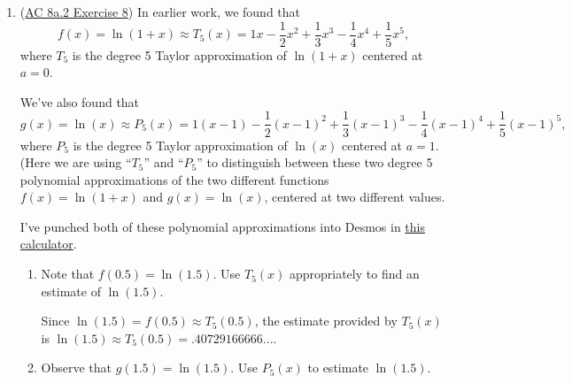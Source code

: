 \begin{enumerate}[leftmargin=0pt]
\begin{enumerate}
    \begin{red}
    This is actually a perfect description of what has happened: we took the thing we got for $\cos(x)$ and just replaced $x$ by $(x-\tfrac\pi2)$, and according to this trigonometric identity, that gives us the values of $\sin(x)$.
    \end{red}
    \end{enumerate}
    
\pagebreak

\item (\href{https://faculty.gvsu.edu/boelkinm/Home/ACS/sec-8a-2-taylor-poly.html#ez-8a-2-3}{AC 8a.2 Exercise 8}) In earlier work, we found that \begin{equation*}
f(x) = \ln(1+x) \approx T_5(x) = 1x - \frac{1}{2}x^2 + \frac{1}{3}x^3 - \frac{1}{4}x^4 + \frac{1}{5}x^5\text{,}
\end{equation*} where $T_5$ is the degree 5 Taylor approximation of $\ln(1+x)$ centered at $a=0$. 

We've also found that
\begin{equation*}
g(x) = \ln(x) \approx P_5(x) = 1(x-1) - \frac{1}{2}(x-1)^2 + \frac{1}{3}(x-1)^3 - \frac{1}{4}(x-1)^4 + \frac{1}{5}(x-1)^5\text{,}
\end{equation*} where $P_5$ is the degree 5 Taylor approximation of $\ln(x)$ centered at $a=1$. (Here we are using ``$T_5$'' and ``$P_5$'' to distinguish between these two degree 5 polynomial approximations of the two different functions $f(x) = \ln(1+x)$ and $g(x) = \ln(x)$, centered at two different values.

\begin{red}
I've punched both of these polynomial approximations into Desmos in \href{https://www.desmos.com/calculator/axd8gvso6n}{this calculator}.
\end{red}

\begin{enumerate}
    \item Note that $f(0.5) = \ln(1.5)$. Use $T_5(x)$ appropriately to find an estimate of $\ln(1.5)$.
    
    \begin{red}
    Since $\ln(1.5) = f(0.5) \approx T_5(0.5)$, the estimate provided by $T_5(x)$ is $\ln(1.5) \approx T_5(0.5) = .40729166666\ldots$.
    \end{red}
    
    \item Observe that $g(1.5) = \ln(1.5)$. Use $P_5(x)$ to estimate $\ln(1.5)$.
    

\end{enumerate}
\end{enumerate}

